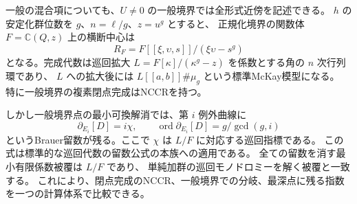 一般の混合項についても、$U\ne0$ の一般境界では全形式近傍を記述できる。
$h$ の安定化群位数を $g$、$n=\ell/g$、$z=u^g$ とすると、
正規化境界の関数体 $F=\mathbb C(Q,z)$ 上の横断中心は
\[
 R_F=F[[\xi,\upsilon,s]]/(\xi\upsilon-s^g)
\]
となる。完成代数は巡回拡大 $L=F[\kappa]/(\kappa^g-z)$ を係数とする角の $n$ 次行列環であり、
$L$ への拡大後には $L[[a,b]]\#\mu_g$ という標準McKay模型になる。
特に一般境界の複素閉点完成はNCCRを持つ。

しかし一般境界点の最小可換解消では、第 $i$ 例外曲線に
\[
 \partial_{E_i}[D]=i\chi,\qquad
 \operatorname{ord}\partial_{E_i}[D]=g/\gcd(g,i)
\]
というBrauer留数が残る。ここで $\chi$ は $L/F$ に対応する巡回指標である。
この式は標準的な巡回代数の留数公式\cite[Proposition~5.8]{HarariBrauer40}の本族への適用である。
全ての留数を消す最小有限係数被覆は $L/F$ であり、
単純加群の巡回モノドロミーを解く被覆と一致する。
これにより、閉点完成のNCCR、一般境界での分岐、最深点に残る指数を一つの計算体系で比較できる。
